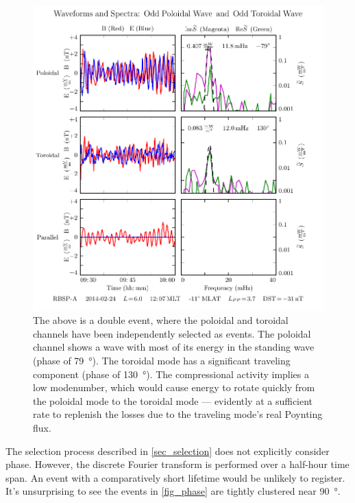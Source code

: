\begin{figure}[!htb]
  \centering
  \includegraphics[width=\textwidth]{figures/sample_event_phase.pdf}
  \caption[Waveforms and Spectra for a Double Pc4 Event]{
    The above is a double event, where the poloidal and toroidal channels have
    been independently selected as events. The poloidal channel shows a wave
    with most of its energy in the standing wave (phase of \SI{79}{\degree}).
    The toroidal mode has a significant traveling component (phase of
    \SI{130}{\degree}). The compressional activity implies a low modenumber,
    which would cause energy to rotate quickly from the poloidal mode to the
    toroidal mode --- evidently at a sufficient rate to replenish the losses
    due to the traveling mode's real Poynting flux. 
  }
  \label{fig_sample_event_phase}
\end{figure}

The selection process described in \cref{sec_selection} does not explicitly
consider phase. However, the discrete Fourier transform is performed over a
half-hour time span. An event with a comparatively short lifetime would be
unlikely to register. It's unsurprising to see the events in \cref{fig_phase}
are tightly clustered near \SI{90}{\degree}. 

